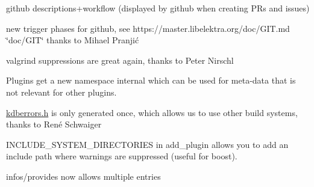 \begin{DoxyItemize}
\item github descriptions+workflow (displayed by github when creating P\+Rs and issues)
\item new trigger phases for github, see https\+://master.libelektra.\+org/doc/\+G\+IT.md \char`\"{}doc/\+G\+I\+T\char`\"{} thanks to Mihael Pranjić
\item valgrind suppressions are great again, thanks to Peter Nirschl
\item Plugins get a new namespace {\ttfamily internal} which can be used for meta-\/data that is not relevant for other plugins.
\item \hyperlink{kdberrors_8h}{kdberrors.\+h} is only generated once, which allows us to use other build systems, thanks to René Schwaiger
\item {\ttfamily I\+N\+C\+L\+U\+D\+E\+\_\+\+S\+Y\+S\+T\+E\+M\+\_\+\+D\+I\+R\+E\+C\+T\+O\+R\+I\+ES} in add\+\_\+plugin allows you to add an include path where warnings are suppressed (useful for boost).
\item {\ttfamily infos/provides} now allows multiple entries
\end{DoxyItemize}


